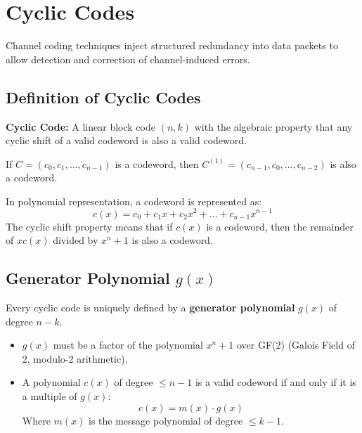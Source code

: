 \documentclass[12pt,a4paper]{article}
\begin{document}
\section{Cyclic Codes}

Channel coding techniques inject structured redundancy into data packets to allow detection and correction of channel-induced errors.

\subsection{Definition of Cyclic Codes}
\begin{tcolorbox}[defbox]
\textbf{Cyclic Code:} A linear block code $(n, k)$ with the algebraic property that any cyclic shift of a valid codeword is also a valid codeword.
\par\vspace{3pt}
If $C = (c_0, c_1, \dots, c_{n-1})$ is a codeword, then $C^{(1)} = (c_{n-1}, c_0, \dots, c_{n-2})$ is also a codeword.
\end{tcolorbox}

In polynomial representation, a codeword is represented as:
\begin{equation}
  c(x) = c_0 + c_1 x + c_2 x^2 + \dots + c_{n-1} x^{n-1}
\end{equation}
The cyclic shift property means that if $c(x)$ is a codeword, then the remainder of $x c(x)$ divided by $x^n + 1$ is also a codeword.

\subsection{Generator Polynomial $g(x)$}
Every cyclic code is uniquely defined by a \textbf{generator polynomial} $g(x)$ of degree $n-k$.
\begin{itemize}[leftmargin=*, itemsep=2pt]
  \item $g(x)$ must be a factor of the polynomial $x^n + 1$ over GF(2) (Galois Field of 2, modulo-2 arithmetic).
  \item A polynomial $c(x)$ of degree $\le n-1$ is a valid codeword if and only if it is a multiple of $g(x)$:
    \begin{equation}
      c(x) = m(x) \cdot g(x)
    \end{equation}
    Where $m(x)$ is the message polynomial of degree $\le k-1$.
\end{itemize}
\end{document}
